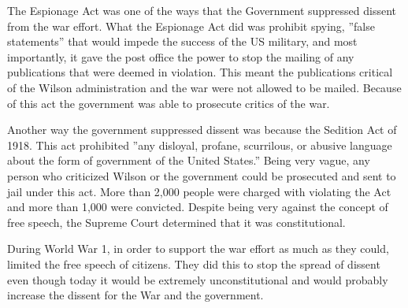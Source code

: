 The Espionage Act was one of the ways that the Government suppressed dissent from the war effort.
What the Espionage Act did was prohibit spying, ''false statements'' that would impede the success of the US military, and most importantly, it gave the post office the power to stop the mailing of any publications that were deemed in violation.
This meant the publications critical of the Wilson administration and the war were not allowed to be mailed.
Because of this act the government was able to prosecute critics of the war.

Another way the government suppressed dissent was because the Sedition Act of 1918.
This act prohibited ''any disloyal, profane, scurrilous, or abusive language about the form of government of the United States.''
Being very vague, any person who criticized Wilson or the government could be prosecuted and sent to jail under this act.
More than 2,000 people were charged with violating the Act and more than 1,000 were convicted.
Despite being very against the concept of free speech, the Supreme Court determined that it was constitutional.

During World War 1, in order to support the war effort as much as they could, limited the free speech of citizens.
They did this to stop the spread of dissent even though today it would be extremely unconstitutional and would probably increase the dissent for the War and the government.